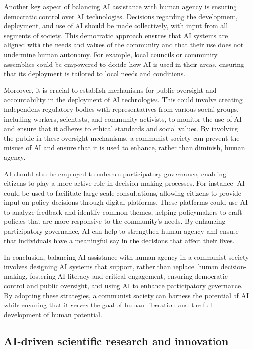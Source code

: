 Another key aspect of balancing AI assistance with human agency is ensuring democratic control over AI technologies. Decisions regarding the development, deployment, and use of AI should be made collectively, with input from all segments of society. This democratic approach ensures that AI systems are aligned with the needs and values of the community and that their use does not undermine human autonomy. For example, local councils or community assemblies could be empowered to decide how AI is used in their areas, ensuring that its deployment is tailored to local needs and conditions.

Moreover, it is crucial to establish mechanisms for public oversight and accountability in the deployment of AI technologies. This could involve creating independent regulatory bodies with representatives from various social groups, including workers, scientists, and community activists, to monitor the use of AI and ensure that it adheres to ethical standards and social values. By involving the public in these oversight mechanisms, a communist society can prevent the misuse of AI and ensure that it is used to enhance, rather than diminish, human agency.

AI should also be employed to enhance participatory governance, enabling citizens to play a more active role in decision-making processes. For instance, AI could be used to facilitate large-scale consultations, allowing citizens to provide input on policy decisions through digital platforms. These platforms could use AI to analyze feedback and identify common themes, helping policymakers to craft policies that are more responsive to the community's needs. By enhancing participatory governance, AI can help to strengthen human agency and ensure that individuals have a meaningful say in the decisions that affect their lives.

In conclusion, balancing AI assistance with human agency in a communist society involves designing AI systems that support, rather than replace, human decision-making, fostering AI literacy and critical engagement, ensuring democratic control and public oversight, and using AI to enhance participatory governance. By adopting these strategies, a communist society can harness the potential of AI while ensuring that it serves the goal of human liberation and the full development of human potential.

\subsection{AI-driven scientific research and innovation}

